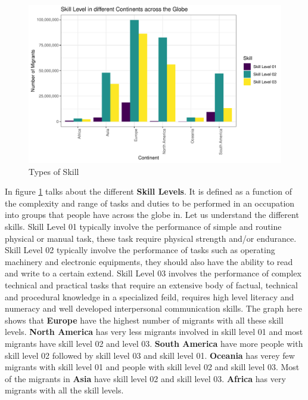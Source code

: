 \documentclass[11pt,a4paper,]{article}
\begin{document}
\begin{figure}
\centering
\includegraphics{ETC5513assignment4_files/figure-latex/skill-1.pdf}
\caption{\label{fig:skill}Types of Skill}
\end{figure}

In figure \ref{fig:skill} talks about the different \textbf{Skill Levels}. It is defined as a function of the complexity and range of tasks and duties to be performed in an occupation into groups that people have across the globe in. Let us understand the different skills. Skill Level 01 typically involve the performance of simple and routine physical or manual task, these task require physical strength and/or endurance. Skill Level 02 typically involve the performance of tasks such as operating machinery and electronic equipments, they should also have the ability to read and write to a certain extend. Skill Level 03 involves the performance of complex technical and practical tasks that require an extensive body of factual, technical and procedural knowledge in a specialized feild, requires high level literacy and numeracy and well developed interpersonal communication skills. The graph here shows that \textbf{Europe} have the highest number of migrants with all these skill levels. \textbf{North America} has very less migrants involved in skill level 01 and most migrants have skill level 02 and level 03. \textbf{South America} have more people with skill level 02 followed by skill level 03 and skill level 01. \textbf{Oceania} has verey few migrants with skill level 01 and people with skill level 02 and skill level 03. Most of the migrants in \textbf{Asia} have skill level 02 and skill level 03. \textbf{Africa} has very migrants with all the skill levels.
\end{document}
